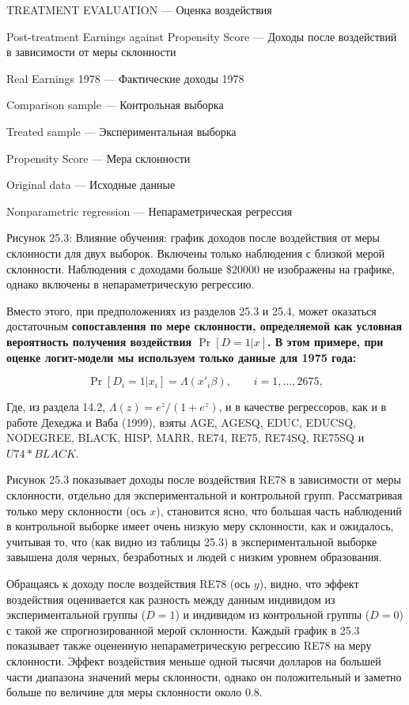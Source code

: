 \vspace{3cm}

TREATMENT EVALUATION --- Оценка воздействия

Post-treatment Earnings against Propensity Score --- Доходы после воздействий в зависимости от меры склонности

Real Earnings 1978 --- Фактические доходы 1978

Comparison sample --- Контрольная выборка

Treated sample --- Экспериментальная выборка

Propensity Score --- Мера склонности

Original data --- Исходные данные

Nonparametric regression --- Непараметрическая регрессия



Рисунок 25.3: Влияние обучения: график доходов после воздействия от меры склонности для двух выборок. Включены только наблюдения с близкой мерой склонности. Наблюдения с доходами больше \$20000 не изображены на графике, однако включены в непараметрическую регрессию. 

Вместо этого, при предположениях из разделов 25.3 и 25.4, может оказаться достаточным \bfseries сопоставления по мере склонности, \mdseries определяемой как условная вероятность получения воздействия $\Pr [D = 1 | x]$. В этом примере, при оценке логит-модели мы используем только данные для 1975 года:

\begin{equation}
\label{eq25.78}
\Pr [D_i = 1 | x_i] = \Lambda (x'_i \beta), \qquad i = 1, \dots, 2675,
\end{equation}

Где, из раздела 14.2, $\Lambda (z) = e^z / (1+e^z)$, и в качестве регрессоров, как и в работе  Дехеджа и Ваба (1999), взяты AGE, AGESQ, EDUC, EDUCSQ, NODEGREE, BLACK, HISP, MARR, RE74, RE75, RE74SQ, RE75SQ и $U74*BLACK$. 

Рисунок 25.3 показывает доходы  после воздействия RE78 в зависимости от меры склонности, отдельно для экспериментальной и контрольной групп. Рассматривая только меру склонности (ось $x$), становится ясно, что большая часть наблюдений в контрольной выборке имеет очень низкую меру склонности, как и ожидалось, учитывая то, что (как видно из таблицы 25.3) в экспериментальной выборке завышена доля черных, безработных и людей с низким уровнем образования. 

Обращаясь к доходу после воздействия RE78 (ось $y$), видно, что эффект воздействия оценивается как разность между данным индивидом из экспериментальной группы ($D = 1$) и индивидом из контрольной группы ($D = 0$) с такой же спрогнозированной мерой склонности. Каждый график в 25.3 показывает также оцененную непараметрическую регрессию RE78 на меру склонности. Эффект воздействия меньше одной тысячи долларов на большей части диапазона значений меры склонности, однако он положительный и заметно больше по величине для меры склонности около 0.8. 

